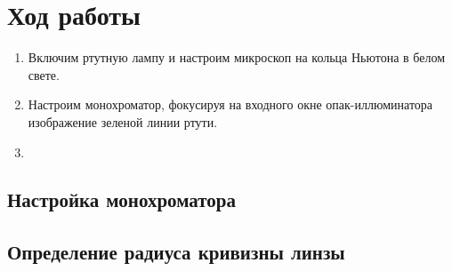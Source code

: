 \documentclass[a4paper, 12pt]{article}
\begin{document}
	\section{Ход работы}
	\begin{enumerate}
		\item Включим ртутную лампу и настроим микроскоп на кольца Ньютона в белом свете.
		\item Настроим монохроматор, фокусируя на входного окне опак-иллюминатора изображение зеленой линии ртути.
		\item 
	\end{enumerate}
	\subsection{Настройка монохроматора}
	\subsection{Определение радиуса кривизны линзы}
\end{document}
